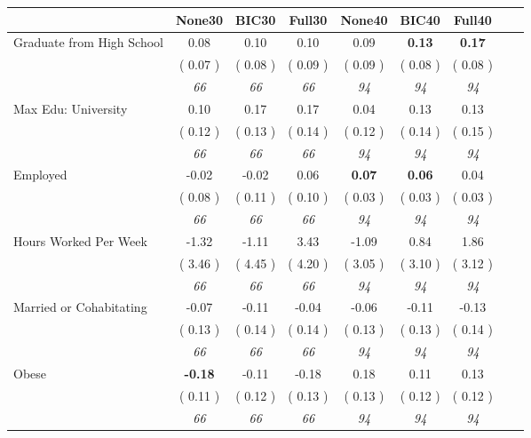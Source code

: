 \begin{tabular}{l c c c c c c c c}
\toprule
 & None30 & BIC30 & Full30 & None40 & BIC40 & Full40 \\
\midrule
Graduate from High School &      0.08 &      0.10 &      0.10 &      0.09 & \textbf{      0.13 } & \textbf{      0.17 } \\
& (     0.07 ) & (     0.08 ) & (     0.09 ) & (     0.09 ) & (     0.08 ) & (     0.08 ) \\
& \textit{ 66 } & \textit{ 66 } & \textit{ 66 } & \textit{ 94 } & \textit{ 94 } & \textit{ 94 } \\
Max Edu: University &      0.10 &      0.17 &      0.17 &      0.04 &      0.13 &      0.13 \\
& (     0.12 ) & (     0.13 ) & (     0.14 ) & (     0.12 ) & (     0.14 ) & (     0.15 ) \\
& \textit{ 66 } & \textit{ 66 } & \textit{ 66 } & \textit{ 94 } & \textit{ 94 } & \textit{ 94 } \\
Employed &     -0.02 &     -0.02 &      0.06 & \textbf{      0.07 } & \textbf{      0.06 } &      0.04 \\
& (     0.08 ) & (     0.11 ) & (     0.10 ) & (     0.03 ) & (     0.03 ) & (     0.03 ) \\
& \textit{ 66 } & \textit{ 66 } & \textit{ 66 } & \textit{ 94 } & \textit{ 94 } & \textit{ 94 } \\
Hours Worked Per Week &     -1.32 &     -1.11 &      3.43 &     -1.09 &      0.84 &      1.86 \\
& (     3.46 ) & (     4.45 ) & (     4.20 ) & (     3.05 ) & (     3.10 ) & (     3.12 ) \\
& \textit{ 66 } & \textit{ 66 } & \textit{ 66 } & \textit{ 94 } & \textit{ 94 } & \textit{ 94 } \\
Married or Cohabitating &     -0.07 &     -0.11 &     -0.04 &     -0.06 &     -0.11 &     -0.13 \\
& (     0.13 ) & (     0.14 ) & (     0.14 ) & (     0.13 ) & (     0.13 ) & (     0.14 ) \\
& \textit{ 66 } & \textit{ 66 } & \textit{ 66 } & \textit{ 94 } & \textit{ 94 } & \textit{ 94 } \\
Obese & \textbf{     -0.18 } &     -0.11 &     -0.18 &      0.18 &      0.11 &      0.13 \\
& (     0.11 ) & (     0.12 ) & (     0.13 ) & (     0.13 ) & (     0.12 ) & (     0.12 ) \\
& \textit{ 66 } & \textit{ 66 } & \textit{ 66 } & \textit{ 94 } & \textit{ 94 } & \textit{ 94 } \\

\end{tabular}
